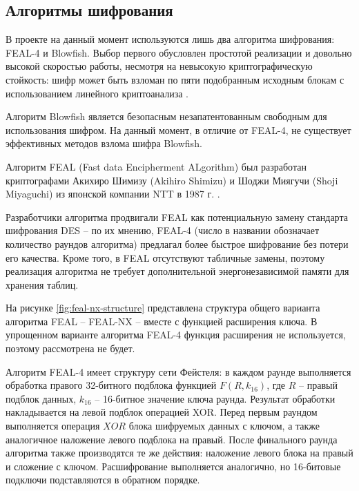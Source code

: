 \newpage
\subsection{Алгоритмы шифрования}

В проекте на данный момент используются лишь два алгоритма шифрования:
FEAL-4 и Blowfish. Выбор первого обусловлен простотой реализации и
довольно высокой скоростью работы, несмотря на невысокую криптографическую
стойкость: шифр может быть взломан по пяти подобранным исходным блокам
с использованием линейного криптоанализа \cite{feal-attack}.

Алгоритм Blowfish является безопасным незапатентованным свободным для
использования шифром. На данный момент, в отличие от FEAL-4, не существует
эффективных методов взлома шифра Blowfish.

Алгоритм FEAL (Fast data Encipherment ALgorithm) был разработан криптографами
Акихиро Шимизу (Akihiro Shimizu) и Шоджи Миягучи (Shoji Miyaguchi) из
японской компании NTT в 1987 г. \cite[стр. 206]{panasenko}.

Разработчики алгоритма продвигали FEAL как потенциальную замену стандарта
шифрования DES -- по их мнению, FEAL-4 (число в названии обозначает количество
раундов алгоритма) предлагал более быстрое шифрование без потери его качества.
Кроме того, в FEAL отсутствуют табличные замены, поэтому реализация алгоритма
не требует дополнительной энергонезависимой памяти для хранения таблиц.

На рисунке \ref{fig:feal-nx-structure} представлена структура общего варианта
алгоритма FEAL -- FEAL-NX -- вместе с функцией расширения ключа. В упрощенном
варианте алгоритма FEAL-4 функция расширения не используется, поэтому рассмотрена
не будет.

Алгоритм FEAL-4 имеет структуру сети Фейстеля:
в каждом раунде выполняется обработка правого 32-битного подблока функцией
$F(R,k_{16})$, где $R$ -- правый подблок данных, $k_{16}$ -- 16-битное значение
ключа раунда. Результат обработки накладывается на левой подблок операцией XOR.
Перед первым раундом выполняется операция $XOR$ блока шифруемых данных с
ключом, а также аналогичное наложение левого подблока на правый.
После финального раунда алгоритма также производятся те же действия:
наложение левого блока на правый и сложение с ключом.
Расшифрование выполняется аналогично, но 16-битовые подключи подставляются
в обратном порядке.

